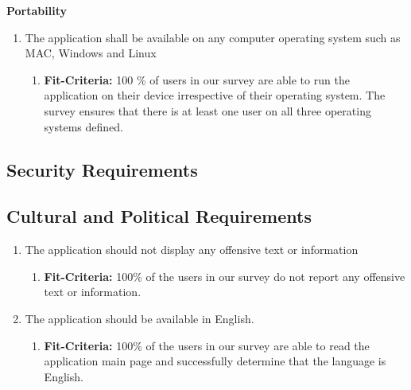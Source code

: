 \documentclass{article}
\begin{document}
\noindent
\textbf{Portability} 
\begin{enumerate}
\item The application shall be available on any computer operating system such as MAC, Windows and Linux
   \begin{enumerate}
    \item \textbf{Fit-Criteria:}  100 \% of users in our survey are able to run the application on their device irrespective of their operating system. The survey ensures that there is at least one user on all three operating systems defined. 
    \end{enumerate}
\end{enumerate}


\subsection{Security Requirements}


\subsection{Cultural and Political Requirements}
\begin{enumerate}
\item The application should not display any offensive text or information 
   \begin{enumerate}
    \item \textbf{Fit-Criteria:}  100\% of the users in our survey do not report any offensive text or information. 
    \end{enumerate}
\item The application should be available in English. 
   \begin{enumerate}
    \item \textbf{Fit-Criteria:}  100\% of the users in our survey are able to read the application main page and successfully determine that the language is English. 
    \end{enumerate}
\end{enumerate}
\end{document}
